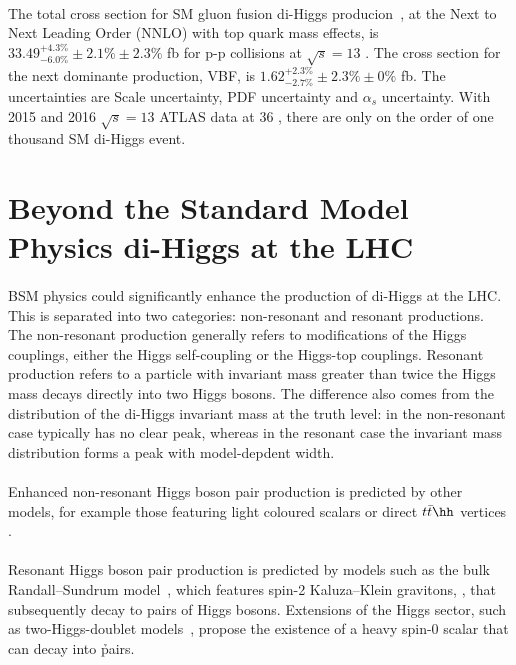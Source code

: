 \paragraph{}
The total cross section for SM gluon fusion di-Higgs producion~\cite{LHCYellow}, at the Next to Next Leading Order (NNLO) with top quark mass effects, is $33.49^{+ 4.3 \%}_{-6.0 \%} \pm 2.1\% \pm 2.3\%$ fb for p-p collisions at $\sqrt{s}=13$ \TeV. The cross section for the next dominante production, VBF, is $1.62^{+ 2.3 \%}_{-2.7 \%} \pm 2.3\% \pm 0\%$ fb. The uncertainties are Scale uncertainty, PDF uncertainty and $\alpha_s$ uncertainty. With 2015 and 2016 $\sqrt{s}=13$ \TeV ATLAS data at 36 \ifb, there are only on the order of one thousand SM di-Higgs event.


\section{Beyond the Standard Model Physics di-Higgs at the LHC}
\paragraph{}
BSM physics could significantly enhance the production of di-Higgs at the LHC. This is separated into two categories: non-resonant and resonant productions. The non-resonant production generally refers to modifications of the Higgs couplings, either the Higgs self-coupling or the Higgs-top couplings. Resonant production refers to a particle with invariant mass greater than twice the Higgs mass decays directly into two Higgs bosons. The difference also comes from the distribution of the di-Higgs invariant mass at the truth level: in the non-resonant case typically has no clear peak, whereas in the resonant case the invariant mass distribution forms a peak with model-depdent width.

\paragraph{}
Enhanced non-resonant Higgs boson pair production is predicted by other models, for example those featuring light coloured scalars \cite{PhysRevD.86.095023} or direct $t\bar{t}\hh$ vertices \cite{Grober:2010yv,Contino:2012xk}.

\paragraph{}
Resonant Higgs boson pair production is predicted by models such as the bulk Randall--Sundrum model~\cite{Agashe:2007zd,Fitzpatrick}, which features spin-2 Kaluza--Klein gravitons, \Grav, that subsequently decay to pairs of Higgs bosons. Extensions of the Higgs sector, such as two-Higgs-doublet models~\cite{PhysRevD.8.1226, Branco:2011iw}, propose the existence of a heavy spin-0 scalar that can decay into \h pairs. 

